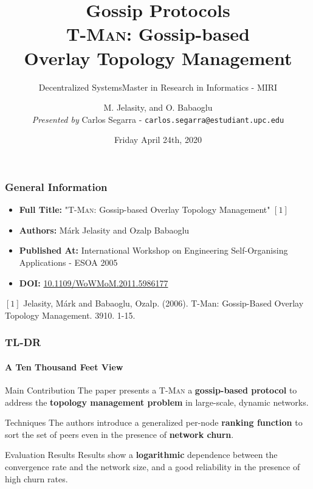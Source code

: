 \documentclass[10pt,    %
    english,            %
    xcolor=table,       %
    envcountsect,        %
    aspectratio=169     %
]{beamer}
\subtitle{Decentralized Systems} %
\title[Decentralized Systems] %
    {\normalsize Gossip Protocols \\ \Large \textsc{T-Man:} Gossip-based \\ \Large Overlay Topology Management}
\subtitle{Master in Research in Informatics - MIRI}
\date[April 24th, 2020] %
    {Friday April 24th, 2020}
\author[] %
{M. Jelasity, and O. Babaoglu \\\small \textit{Presented by} Carlos Segarra - \texttt{carlos.segarra@estudiant.upc.edu}}
\begin{document}
\begin{frame}
  \titlepage
\end{frame}

\begin{frame}
    \frametitle{General Information}

    \begin{itemize}
        \item \textbf{Full Title:} "\textsc{T-Man:} Gossip-based Overlay Topology Management" $[1]$
        \item \textbf{Authors:} M\'ark Jelasity and Ozalp Babaoglu
        \item \textbf{Published At:} International Workshop on Engineering Self-Organising Applications
 - ESOA 2005
        \item \textbf{DOI:} \href{https://doi.org/10.1109/WoWMoM.2011.5986177}{10.1109/WoWMoM.2011.5986177}
    \end{itemize}


    \small
    \begin{description}
        \item $[1]$ Jelasity, Márk and Babaoglu, Ozalp. (2006). T-Man: Gossip-Based Overlay Topology Management. 3910. 1-15. 
    \end{description}
 

\end{frame}

\begin{frame}
    \frametitle{TL-DR}
    \framesubtitle{A Ten Thousand Feet View}

    \vspace{-25pt}

    \begin{alertblock}{Main Contribution}
        The paper presents a \textsc{T-Man} a \textbf{gossip-based protocol} to address the \textbf{topology management problem} in large-scale, dynamic networks.
    \end{alertblock}

    \begin{block}{Techniques}
        The authors introduce a generalized per-node \textbf{ranking function} to sort the set of peers even in the presence of \textbf{network churn}.
    \end{block}

    \begin{alertblock}{Evaluation Results}
        Results show a \textbf{logarithmic} dependence between the convergence rate and the network size, and a good reliability in the presence of high churn rates.
    \end{alertblock}

\end{frame}
\end{document}
